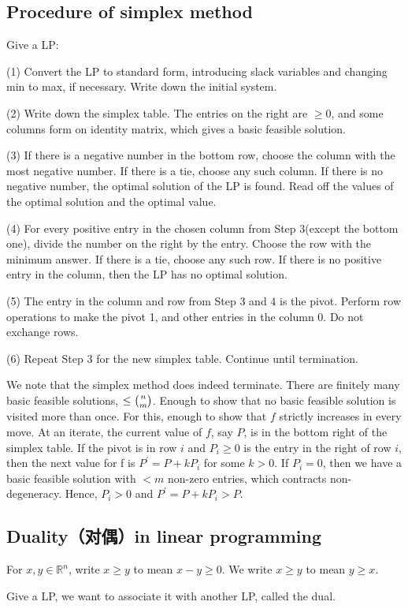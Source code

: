 \subsection{Procedure of simplex method}
\begin{procedure}
    Give a LP:

    (1) Convert the LP to standard form, introducing slack variables and changing min to max, if necessary. Write down the initial system.

    (2) Write down the simplex table. The entries on the right are $\ge 0$, and some columns form on identity matrix, which gives a basic feasible solution.

    (3) If there is a negative number in the bottom row, choose the column with the most negative number. If there is a tie, choose any such column. If there is no negative number, the optimal solution of the LP is found. Read off the values of the optimal solution and the optimal value.

    (4) For every positive entry in the chosen column from Step 3(except the bottom one), divide the number on the right by the entry. Choose the row with the minimum answer. If there is a tie, choose any such row. If there is no positive entry in the column, then the LP has no optimal solution.

    (5) The entry in the column and row from Step 3 and 4 is the pivot. Perform row operations to make the pivot 1, and other entries in the column 0. Do not exchange rows.

    (6) Repeat Step 3 for the new simplex table. Continue until termination.
\end{procedure}
\begin{remark}
    We note that the simplex method does indeed terminate. There are finitely many basic feasible solutions, $\le \tbinom{n}{m}$. Enough to show that no basic feasible solution is visited more than once. For this, enough to show that $f$ strictly increases in every move. At an iterate, the current value of $f$, say $P$, is in the bottom right of the simplex table. If the pivot is in row $i$ and $P_i\ge 0$ is the entry in the right of row $i$, then the next value for f is $P^{\prime} = P + kP_i$ for some $k>0$. If $P_i = 0$, then we have a basic feasible solution with $<m$ non-zero entries, which contracts non-degeneracy. Hence, $P_i>0$ and $P^{\prime} = P + kP_i > P$.
\end{remark}

\subsection{Duality（对偶）in linear programming}
For $x, y\in\mathbb{R}^n$, write $x\ge y$ to mean $x-y\ge 0$. We write $x\ge y$ to mean $y\ge x$.
\begin{remark}
    Give a LP, we want to associate it with another LP, called the dual.
\end{remark}

